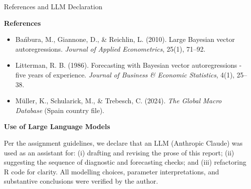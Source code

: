 \documentclass[9pt]{beamer}
\begin{document}
\begin{frame}{References and LLM Declaration}
\scriptsize

\textbf{References}

\begin{itemize}
    \item Bańbura, M., Giannone, D., \& Reichlin, L. (2010). Large Bayesian vector autoregressions. \textit{Journal of Applied Econometrics}, 25(1), 71--92.
    \item Litterman, R. B. (1986). Forecasting with Bayesian vector autoregressions - five years of experience. \textit{Journal of Business \& Economic Statistics}, 4(1), 25--38.
    \item Müller, K., Schularick, M., \& Trebesch, C. (2024). \textit{The Global Macro Database} (Spain country file).
\end{itemize}

\vspace{0.25cm}

\textbf{Use of Large Language Models}

Per the assignment guidelines, we declare that an LLM (Anthropic Claude) was used as an assistant for:
(i) drafting and revising the prose of this report;
(ii) suggesting the sequence of diagnostic and forecasting checks; and
(iii) refactoring R code for clarity. All modelling choices, parameter interpretations, and substantive conclusions were verified by the author.

\end{frame}
\end{document}
